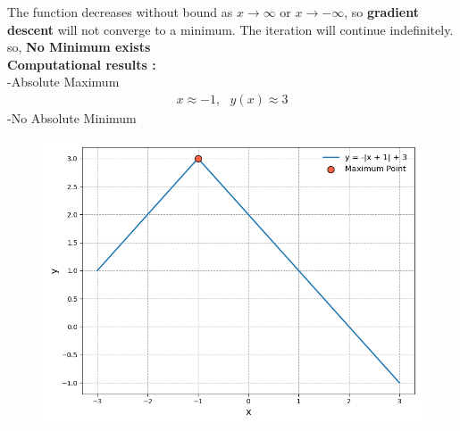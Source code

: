 \documentclass[journal]{IEEEtran}
\begin{document}
The function decreases without bound as $x \rightarrow \infty$ or $x \rightarrow -\infty$, so \textbf{gradient descent} will not converge to a minimum. The iteration will continue indefinitely.
so, \textbf{No Minimum exists}\\

\textbf{Computational results :}\\
-Absolute Maximum
\begin{align}
    x \approx -1 , \text{ } y(x) \approx 3  
\end{align}
-No Absolute Minimum\\

 \begin{figure}[ht!]
   \centering
   \includegraphics[width=\columnwidth]{figs/Figure_1.png}
\end{figure}
\end{document}
